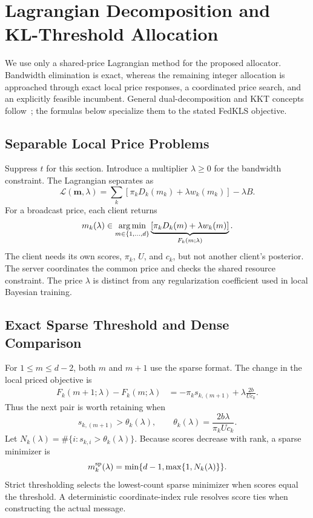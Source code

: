 \section{Lagrangian Decomposition and KL-Threshold Allocation}
\label{sec:solution}
We use only a shared-price Lagrangian method for the proposed allocator. Bandwidth elimination is exact, whereas the remaining integer allocation is approached through exact local price responses, a coordinated price search, and an explicitly feasible incumbent. General dual-decomposition and KKT concepts follow~\cite{decomposition,boyd}; the formulas below specialize them to the stated FedKLS objective.

\subsection{Separable Local Price Problems}
Suppress $t$ for this section. Introduce a multiplier $\lambda\ge0$ for the bandwidth constraint. The Lagrangian separates as
\begin{equation}
 \mathcal L(\mathbf m,\lambda)
 =\sum_k\left[\pi_kD_k(m_k)+\lambda w_k(m_k)\right]-\lambda B.
 \label{eq:lagrangian}
\end{equation}
For a broadcast price, each client returns
\begin{equation}
 m_k(\lambda)\in
 \operatorname*{arg\,min}_{m\in\{1,\ldots,d\}}
 \underbrace{\left[\pi_kD_k(m)+\lambda w_k(m)\right]}_{F_k(m;\lambda)}.
 \label{eq:local-price}
\end{equation}
The client needs its own scores, $\pi_k$, $U$, and $c_k$, but not another client's posterior. The server coordinates the common price and checks the shared resource constraint. The price $\lambda$ is distinct from any regularization coefficient used in local Bayesian training.

\subsection{Exact Sparse Threshold and Dense Comparison}
For $1\le m\le d-2$, both $m$ and $m+1$ use the sparse format. The change in the local priced objective is
\begin{align}
 F_k(m+1;\lambda)-F_k(m;\lambda)
 &=-\pi_ks_{k,(m+1)}+\lambda\frac{2b}{Uc_k}.
 \label{eq:marginal-change}
\end{align}
Thus the next pair is worth retaining when
\begin{equation}
 s_{k,(m+1)}>\theta_k(\lambda),\qquad
 \theta_k(\lambda)=\frac{2b\lambda}{\pi_kUc_k}.
 \label{eq:threshold}
\end{equation}
Let $N_k(\lambda)=\#\{i:s_{k,i}>\theta_k(\lambda)\}$. Because scores decrease with rank, a sparse minimizer is
\begin{equation}
 m_k^{\mathrm{sp}}(\lambda)
 =\min\{d-1,\max\{1,N_k(\lambda)\}\}.
 \label{eq:sparse-response}
\end{equation}
Strict thresholding selects the lowest-count sparse minimizer when scores equal the threshold. A deterministic coordinate-index rule resolves score ties when constructing the actual message.

